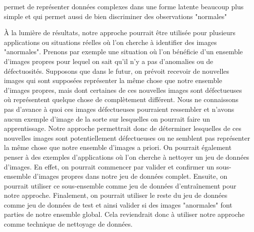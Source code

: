  \DIFaddend permet de représenter \DIFdelbegin {}\DIFdelend \DIFaddbegin {}\DIFaddend données complexes dans une forme latente beaucoup plus simple et qui permet aussi de bien discriminer \DIFdelbegin {}\DIFdelend des observations "normales" \DIFdelbegin {}\DIFdelend \DIFaddbegin {}\DIFaddend 

À la lumière de \DIFdelbegin {}\DIFdelend \DIFaddbegin {}\DIFaddend résultats, notre approche pourrait être utilisée pour plusieurs applications ou situations réelles où l'on cherche à identifier des images "anormales". Prenons par exemple une situation où l'on bénéficie d'un ensemble d'images propres pour lequel on sait qu'il n'y a pas d'anomalies ou de défectuosités. Supposons que dans le futur, on prévoit recevoir de nouvelles images qui sont supposées représenter la même chose que notre ensemble d'images propres, mais dont certaines de ces nouvelles images sont défectueuses où représentent quelque chose de complètement différent. Nous ne connaissons pas d'avance à quoi ces images défectueuses pourraient ressembler et n'avons aucun exemple d'image de la sorte sur lesquelles on pourrait faire un apprentissage. Notre approche permettrait donc de déterminer lesquelles de ces nouvelles images sont potentiellement défectueuses ou ne semblent pas représenter la même chose que notre ensemble d'images a priori. On pourrait également penser à des exemples d'applications où l'on cherche à nettoyer un jeu de données d'images. En effet, on pourrait commencer par valider et confirmer un sous-ensemble d'images propres dans notre jeu de données complet. Ensuite, on pourrait utiliser ce sous-ensemble comme jeu de données d'entraînement pour notre approche. Finalement, on pourrait utiliser le reste du jeu de données comme jeu de données de test et ainsi valider si des images "anormales" font parties de notre ensemble global. Cela reviendrait donc à utiliser notre approche comme technique de nettoyage de données.

